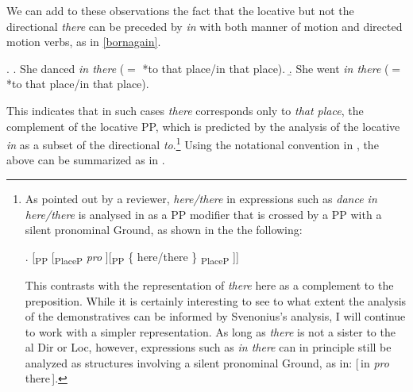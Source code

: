 \vskip 0.9cm
 
\noindent
We can add to these observations the fact that the locative but not the directional \textit{there} can be preceded by \textit{in} with both manner of motion and directed motion verbs, as in \ref{bornagain}.

\ex.\label{bornagain}
\a. She danced \textit{in there} ($=$ *to that place/in that place).
\b. She went \textit{in there} ($=$ *to that place/in that place).


\noindent 
This indicates that in such cases \textit{there} corresponds only to \textit{that place}, the complement of the locative PP, which is predicted by the analysis of the locative  \textit{in} as a subset of the directional \textit{to}.\footnote{As pointed out by a reviewer, \textit{here/there} in expressions such as \textit{dance in here/there} is analysed in \cite{Svenonius2010} as a PP modifier that is crossed by a PP with a silent pronominal Ground, as shown in the the following:

\noindent\parbox{\linguexfootnotewidth}{\ex.
\setlength{\arrowht}{3ex}
\newcommand*\cgdepthstrut{{\vrule height 0pt depth \arrowht width 0pt}}
\renewcommand\eachwordone{\cgdepthstrut\rmfamily}
\newcommand\arrowex{\setlength{\arrowht}{1ex}\ex}
[\textsubscript{PP} [\textsubscript{PlaceP}  \textit{pro} ][\textsubscript{PP} \{ here/there \}  \textsubscript{PlaceP}  ]]

} \vspace*{.5\baselineskip}

\noindent This contrasts with the representation of \textit{there} here as a complement to the preposition. While it is certainly interesting to see to what extent the analysis of the  demonstratives can be informed by Svenonius's analysis, I will continue to work with a simpler representation. As long as \textit{there} is not a sister to the al Dir or Loc, however, expressions such as \textit{in there} can in principle still be analyzed as structures involving a silent pronominal Ground, as in: [\,in \textit{pro} there\,].
} %
Using the notational convention in \cite{GVW-Olinco}, the above can be summarized as in .

